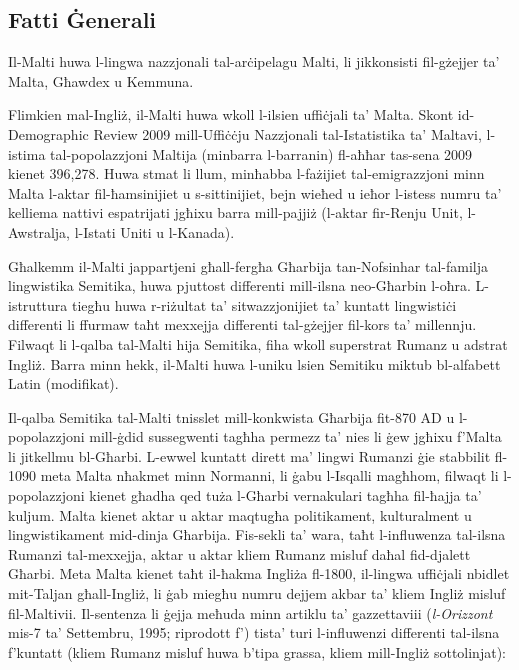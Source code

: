 \documentclass[]{../../metanetpaper}
\begin{document}
\begin{multicols}{2}

\subsection{Fatti Ġenerali}

Il-Malti huwa l-lingwa nazzjonali tal-arċipelagu Malti, li jikkonsisti fil-gżejjer ta’ Malta, Għawdex u Kemmuna.
    
Flimkien mal-Ingliż, il-Malti huwa wkoll l-ilsien uffiċjali ta’ Malta. Skont id-Demographic Review 2009 mill-Uffiċċju Nazzjonali tal-Istatistika ta’ Maltavi, l-istima tal-popolazzjoni Maltija (minbarra l-barranin) fl-aħħar tas-sena 2009 kienet 396,278. Huwa stmat li llum, minħabba l-fażijiet tal-emigrazzjoni minn Malta l-aktar fil-ħamsinijiet u s-sittinijiet, bejn wieħed u ieħor l-istess numru ta’ kelliema nattivi espatrijati jgħixu barra mill-pajjiż (l-aktar fir-Renju Unit, l-Awstralja, l-Istati Uniti u l-Kanada).
    
Għalkemm il-Malti jappartjeni għall-fergħa Għarbija tan-Nofsinhar tal-familja lingwistika Semitika, huwa pjuttost differenti mill-ilsna neo-Għarbin l-oħra. L-istruttura tiegħu huwa r-riżultat ta’ sitwazzjonijiet ta’ kuntatt lingwistiċi differenti li ffurmaw taħt mexxejja differenti tal-gżejjer fil-kors ta' millennju. Filwaqt li l-qalba tal-Malti hija Semitika, fiha wkoll superstrat Rumanz u adstrat Ingliż. Barra minn hekk, il-Malti huwa l-uniku lsien Semitiku miktub bl-alfabett Latin (modifikat).
    
Il-qalba Semitika tal-Malti tnisslet mill-konkwista Għarbija fit-870 AD u l-popolazzjoni mill-ġdid sussegwenti tagħha permezz ta’ nies li ġew jgħixu f’Malta li jitkellmu bl-Għarbi. L-ewwel kuntatt dirett ma’ lingwi Rumanzi ġie stabbilit fl-1090 meta Malta nħakmet minn Normanni, li ġabu l-Isqalli magħhom, filwaqt li l-popolazzjoni kienet għadha qed tuża l-Għarbi vernakulari tagħha fil-ħajja ta’ kuljum. Malta kienet aktar u aktar maqtugħa politikament, kulturalment u lingwistikament mid-dinja Għarbija. Fis-sekli ta’ wara, taħt l-influwenza tal-ilsna Rumanzi tal-mexxejja, aktar u aktar kliem Rumanz misluf daħal fid-djalett Għarbi. Meta Malta kienet taħt il-ħakma Ingliża fl-1800, il-lingwa uffiċjali nbidlet mit-Taljan għall-Ingliż, li ġab miegħu numru dejjem akbar ta’ kliem Ingliż misluf fil-Maltivii. Il-sentenza li ġejja meħuda minn artiklu ta’ gazzettaviii (\emph{l-Orizzont} mis-7 ta’ Settembru, 1995; riprodott f’\cite{Ambros:1998}) tista’ turi l-influwenzi differenti tal-ilsna f'kuntatt (kliem Rumanz misluf huwa b’tipa grassa, kliem mill-Ingliż sottolinjat):


\end{multicols}
\end{document}
